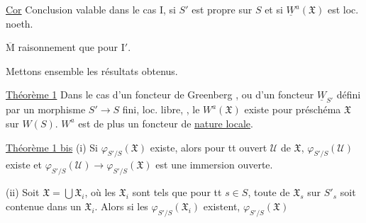 \uline{Cor} Conclusion valable dans le cas $\mathrm I$, si
$S'$ est propre sur $S$ et si $\underline W^a(\mathfrak X)$ est loc. noeth.

$\overline{\mathrm M}$ raisonnement que pour $\mathrm I'$.

Mettons ensemble les résultats obtenus.

\uline{Théorème 1} Dans le cas d'un foncteur de Greenberg
, ou d'un foncteur $\underline W_{S'}$ défini
par un morphisme $S'\to S$ fini, loc. libre,
 , le $W^a(\mathfrak X)$ existe pour
 préschéma $\mathfrak X$ sur $W(S)$.
$W^a$ est de plus un foncteur de \uline{nature locale}.

\uline{Théorème 1 bis}
(i) Si $\varphi_{S'/S}(\mathfrak X)$ existe, alors
pour tt ouvert $\mathcal U$ de $\mathfrak X$,
$\varphi_{S'/S}(\mathcal U)$ existe
et $\varphi_{S'/S}(\mathcal U)\to\varphi_{S'/S}(\mathfrak X)$ est une
immersion ouverte.

(ii) Soit $\mathfrak X=\bigcup\mathfrak X_i$, où les $\mathfrak X_i$ sont
tels que pour tt $s\in S$, toute 
 de $\mathfrak X_s$ sur $S'_s$ soit contenue dans un $\mathfrak X_i$.
Alors si les $\varphi_{S'/S}(\mathfrak X_i)$ existent, $\varphi_{S'/S}(\mathfrak X)$
